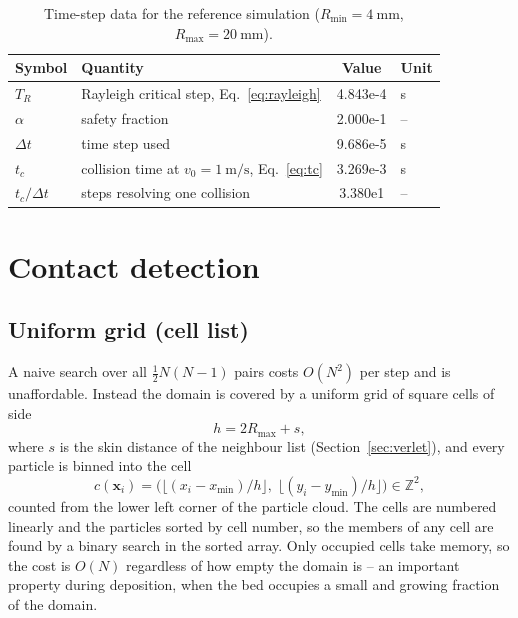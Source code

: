 \begin{table}[htbp]
  \centering
  \caption{Time-step data for the reference simulation
  ($R_{\min}=\qty{4}{\milli\metre}$, $R_{\max}=\qty{20}{\milli\metre}$).}
  \label{tab:dt}
  \begin{tabular}{llS[table-format=1.3e2]l}
    \toprule
    Symbol & Quantity & {Value} & Unit \\
    \midrule
    $T_{R}$    & Rayleigh critical step, Eq.~\eqref{eq:rayleigh} & 4.843e-4 & \unit{\second} \\
    $\alpha$   & safety fraction                                 & 2.000e-1 & -- \\
    $\Delta t$ & time step used                                  & 9.686e-5 & \unit{\second} \\
    $t_{c}$    & collision time at $v_{0}=\qty{1}{\metre\per\second}$,
                 Eq.~\eqref{eq:tc}                               & 3.269e-3 & \unit{\second} \\
    $t_{c}/\Delta t$ & steps resolving one collision             & 3.380e1  & -- \\
    \bottomrule
  \end{tabular}
\end{table}

\section{Contact detection}
\label{sec:broadphase}

\subsection{Uniform grid (cell list)}

A naive search over all $\tfrac{1}{2}N(N-1)$ pairs costs $O(N^{2})$ per step and
is unaffordable.  Instead the domain is covered by a uniform grid of square
cells of side
\begin{equation}
  h = 2R_{\max} + s,
  \label{eq:cellsize}
\end{equation}
where $s$ is the skin distance of the neighbour list
(Section~\ref{sec:verlet}), and every particle is binned into the cell
\begin{equation}
  c(\mathbf{x}_{i}) = \bigl(\lfloor (x_{i}-x_{\min})/h\rfloor,\;
                            \lfloor (y_{i}-y_{\min})/h\rfloor\bigr)
                    \in \mathbb{Z}^{2},
  \label{eq:cellindex}
\end{equation}
counted from the lower left corner of the particle cloud.  The cells are
numbered linearly and the particles sorted by cell number, so the members of any
cell are found by a binary search in the sorted array.  Only occupied cells take
memory, so the cost is $O(N)$ regardless of how empty the domain is -- an
important property during deposition, when the bed occupies a small and growing
fraction of the domain.

